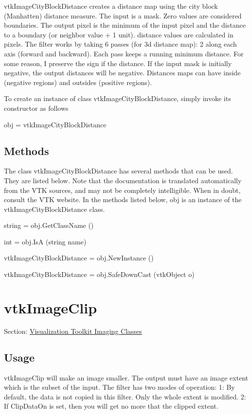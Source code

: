 vtk\-Image\-City\-Block\-Distance creates a distance map using the city block (Manhatten) distance measure. The input is a mask. Zero values are considered boundaries. The output pixel is the minimum of the input pixel and the distance to a boundary (or neighbor value + 1 unit). distance values are calculated in pixels. The filter works by taking 6 passes (for 3d distance map)\-: 2 along each axis (forward and backward). Each pass keeps a running minimum distance. For some reason, I preserve the sign if the distance. If the input mask is initially negative, the output distances will be negative. Distances maps can have inside (negative regions) and outsides (positive regions).

To create an instance of class vtk\-Image\-City\-Block\-Distance, simply invoke its constructor as follows \begin{DoxyVerb}  obj = vtkImageCityBlockDistance
\end{DoxyVerb}
 \hypertarget{vtkwidgets_vtkxyplotwidget_Methods}{}\subsection{Methods}\label{vtkwidgets_vtkxyplotwidget_Methods}
The class vtk\-Image\-City\-Block\-Distance has several methods that can be used. They are listed below. Note that the documentation is translated automatically from the V\-T\-K sources, and may not be completely intelligible. When in doubt, consult the V\-T\-K website. In the methods listed below, {\ttfamily obj} is an instance of the vtk\-Image\-City\-Block\-Distance class. 
\begin{DoxyItemize}
\item {\ttfamily string = obj.\-Get\-Class\-Name ()}  
\item {\ttfamily int = obj.\-Is\-A (string name)}  
\item {\ttfamily vtk\-Image\-City\-Block\-Distance = obj.\-New\-Instance ()}  
\item {\ttfamily vtk\-Image\-City\-Block\-Distance = obj.\-Safe\-Down\-Cast (vtk\-Object o)}  
\end{DoxyItemize}\hypertarget{vtkimaging_vtkimageclip}{}\section{vtk\-Image\-Clip}\label{vtkimaging_vtkimageclip}
Section\-: \hyperlink{sec_vtkimaging}{Visualization Toolkit Imaging Classes} \hypertarget{vtkwidgets_vtkxyplotwidget_Usage}{}\subsection{Usage}\label{vtkwidgets_vtkxyplotwidget_Usage}
vtk\-Image\-Clip will make an image smaller. The output must have an image extent which is the subset of the input. The filter has two modes of operation\-: 1\-: By default, the data is not copied in this filter. Only the whole extent is modified. 2\-: If Clip\-Data\-On is set, then you will get no more that the clipped extent.

